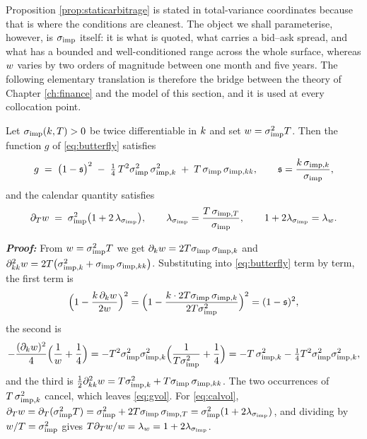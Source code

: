 Proposition \ref{prop:staticarbitrage} is stated in total-variance coordinates because that is where
the conditions are cleanest. The object we shall parameterise, however, is $\sigma_{\mathrm{imp}}$ itself: it is what
is quoted, what carries a bid--ask spread, and what has a bounded and well-conditioned range across
the whole surface, whereas $w$ varies by two orders of magnitude between one month and five
years. The following elementary translation is therefore the bridge between the theory of Chapter
\ref{ch:finance} and the model of this section, and it is used at every collocation point.

\begin{proposition}\label{prop:gvol}
Let $\sigma_{\mathrm{imp}}(k,T)>0$ be twice differentiable in $k$ and set $w=\sigma_{\mathrm{imp}}^{2}T$. Then the
function $g$ of \eqref{eq:butterfly} satisfies
\begin{equation}\label{eq:gvol}
  g \;=\; \bigl(1-\mathfrak{s}\bigr)^{2}\;-\;\tfrac{1}{4}\,T^{2}\sigma_{\mathrm{imp}}^{2}\,\sigma_{\mathrm{imp},k}^{2}\;+\;T\,\sigma_{\mathrm{imp}}\,\sigma_{\mathrm{imp},kk},
  \qquad \mathfrak{s}=\frac{k\,\sigma_{\mathrm{imp},k}}{\sigma_{\mathrm{imp}}},
\end{equation}
and the calendar quantity satisfies
\begin{equation}\label{eq:calvol}
  \partial_{T}w \;=\; \sigma_{\mathrm{imp}}^{2}\bigl(1+2\,\lambda_{\sigma_{\mathrm{imp}}}\bigr),
  \qquad
  \lambda_{\sigma_{\mathrm{imp}}}=\frac{T\,\sigma_{\mathrm{imp},T}}{\sigma_{\mathrm{imp}}}, \qquad 1+2\lambda_{\sigma_{\mathrm{imp}}}=\lambda_{w} .
\end{equation}
\end{proposition}

\textbf{\textit{Proof:}} From $w=\sigma_{\mathrm{imp}}^{2}T$ we get $\partial_{k}w=2T\sigma_{\mathrm{imp}}\,\sigma_{\mathrm{imp},k}$ and
$\partial^{2}_{kk}w=2T\bigl(\sigma_{\mathrm{imp},k}^{2}+\sigma_{\mathrm{imp}}\,\sigma_{\mathrm{imp},kk}\bigr)$. Substituting into
\eqref{eq:butterfly} term by term, the first term is
\[
  \Bigl(1-\frac{k\,\partial_{k}w}{2w}\Bigr)^{2}
  =\Bigl(1-\frac{k\cdot 2T\sigma_{\mathrm{imp}}\,\sigma_{\mathrm{imp},k}}{2T\sigma_{\mathrm{imp}}^{2}}\Bigr)^{2}=(1-\mathfrak{s})^{2},
\]
the second is
\[
  -\frac{(\partial_{k}w)^{2}}{4}\Bigl(\frac{1}{w}+\frac14\Bigr)
  =-T^{2}\sigma_{\mathrm{imp}}^{2}\sigma_{\mathrm{imp},k}^{2}\Bigl(\frac{1}{T\sigma_{\mathrm{imp}}^{2}}+\frac14\Bigr)
  =-T\,\sigma_{\mathrm{imp},k}^{2}-\tfrac14 T^{2}\sigma_{\mathrm{imp}}^{2}\sigma_{\mathrm{imp},k}^{2},
\]
and the third is $\tfrac12\partial^{2}_{kk}w=T\sigma_{\mathrm{imp},k}^{2}+T\sigma_{\mathrm{imp}}\,\sigma_{\mathrm{imp},kk}$. The two
occurrences of $T\,\sigma_{\mathrm{imp},k}^{2}$ cancel, which leaves \eqref{eq:gvol}. For \eqref{eq:calvol},
$\partial_{T}w=\partial_{T}(\sigma_{\mathrm{imp}}^{2}T)=\sigma_{\mathrm{imp}}^{2}+2T\sigma_{\mathrm{imp}}\,\sigma_{\mathrm{imp},T}=\sigma_{\mathrm{imp}}^{2}(1+2\lambda_{\sigma_{\mathrm{imp}}})$,
and dividing by $w/T=\sigma_{\mathrm{imp}}^{2}$ gives $T\partial_Tw/w=\lambda_{w}=1+2\lambda_{\sigma_{\mathrm{imp}}}$.
\qedfilledtext

